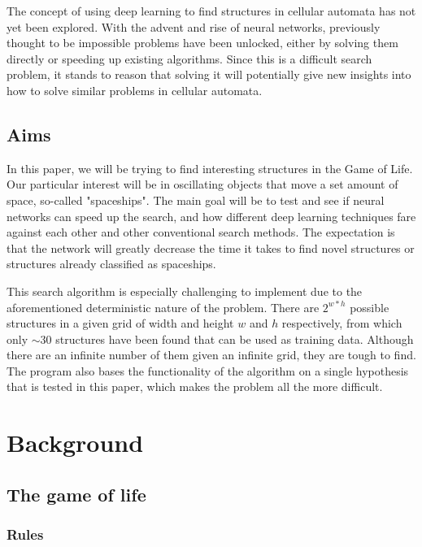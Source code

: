\documentclass{l4proj}
\begin{document}
The concept of using deep learning to find structures in cellular automata has not yet been explored. With the advent and rise of neural networks, previously thought to be impossible problems have been unlocked, either by solving them directly or speeding up existing algorithms. Since this is a difficult search problem, it stands to reason that solving it will potentially give new insights into how to solve similar problems in cellular automata.


\section{Aims}

In this paper, we will be trying to find interesting structures in the Game of Life. Our particular interest will be in oscillating objects that move a set amount of space, so-called "spaceships". The main goal will be to test and see if neural networks can speed up the search, and how different deep learning techniques fare against each other and other conventional search methods. The expectation is that the network will greatly decrease the time it takes to find novel structures or structures already classified as spaceships.

This search algorithm is especially challenging to implement due to the aforementioned deterministic nature of the problem. There are $2^{w * h}$ possible structures in a given grid of width and height $w$ and $h$ respectively, from which only $\sim{30}$ structures have been found that can be used as training data. Although there are an infinite number of them given an infinite grid, they are tough to find. The program also bases the functionality of the algorithm on a single hypothesis that is tested in this paper, which makes the problem all the more difficult. 


\chapter{Background}

\section{The game of life}

\subsection{Rules}
\end{document}
